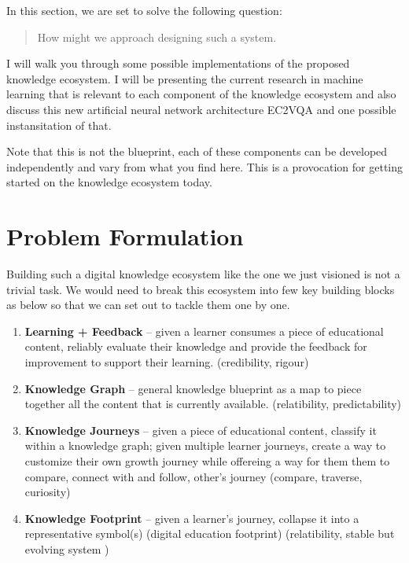 \documentclass[]{book}
\theoremstyle{definition}
\theoremstyle{definition}
\theoremstyle{definition}
\theoremstyle{remark}
\begin{document}
In this section, we are set to solve the following question:

\begin{quote}
How might we approach designing such a system.
\end{quote}

I will walk you through some possible implementations of the proposed
knowledge ecosystem. I will be presenting the current research in
machine learning that is relevant to each component of the knowledge
ecosystem and also discuss this new artificial neural network
architecture EC2VQA and one possible instansitation of that.

Note that this is not the blueprint, each of these components can be
developed independently and vary from what you find here. This is a
provocation for getting started on the knowledge ecosystem today.

\section{Problem Formulation}\label{problem-formulation}

Building such a digital knowledge ecosystem like the one we just
visioned is not a trivial task. We would need to break this ecosystem
into few key building blocks as below so that we can set out to tackle
them one by one.

\begin{enumerate}
\def\labelenumi{\arabic{enumi}.}
\item
  \textbf{Learning + Feedback} -- given a learner consumes a piece of
  educational content, reliably evaluate their knowledge and provide the
  feedback for improvement to support their learning. (credibility,
  rigour)
\item
  \textbf{Knowledge Graph} -- general knowledge blueprint as a map to
  piece together all the content that is currently available.
  (relatibility, predictability)
\item
  \textbf{Knowledge Journeys} -- given a piece of educational content,
  classify it within a knowledge graph; given multiple learner journeys,
  create a way to customize their own growth journey while offereing a
  way for them them to compare, connect with and follow, other's journey
  (compare, traverse, curiosity)
\item
  \textbf{Knowledge Footprint} -- given a learner's journey, collapse it
  into a representative symbol(s) (digital education footprint)
  (relatibility, stable but evolving system )
\end{enumerate}
\end{document}
